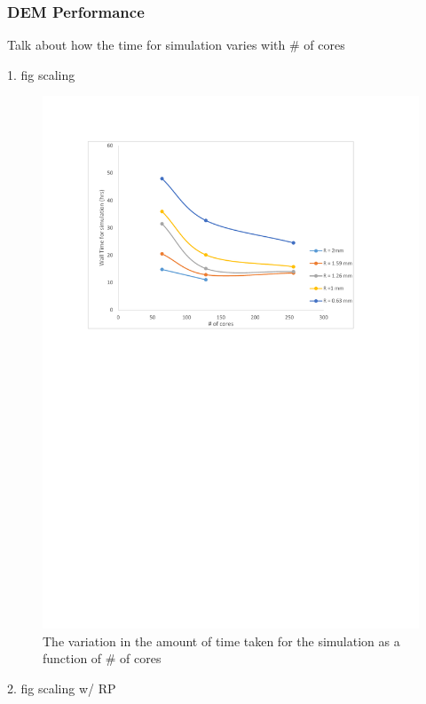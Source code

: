 \documentclass[preprint,11pt,authoryear]{elsarticle}
\begin{document}
	    \subsubsection{DEM Performance}
	    \par Talk about how the time for simulation varies with \# of cores
	    \par 1. fig scaling 
	      \begin{figure}[H]
	      \centering
	      \includegraphics[scale=0.7]{timing_plot.pdf}
	      \caption{The variation in the amount of time taken for the simulation as a function of \# of cores}
	      \label{fig:rslts_DEM_strong_scale}
	      \end{figure}
	    \par 2. fig scaling w/ RP  
\end{document}
